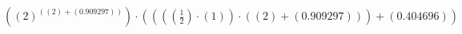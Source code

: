 \documentclass{article}
\begin{document}
$((2)^{((2) + (0.909297))})\cdot((((\frac{1}{2})\cdot(1))\cdot((2) + (0.909297))) + (0.404696))$
\end{document}
